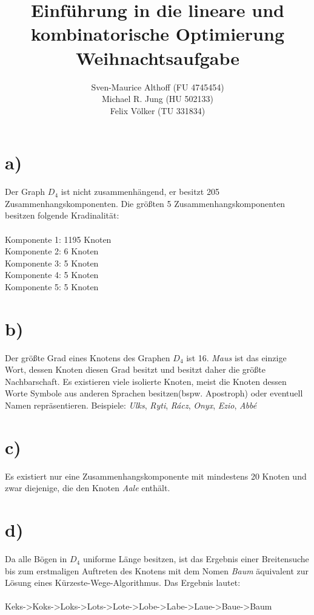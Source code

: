 \documentclass[a4paper,12pt,german]{scrartcl}
\title{Einführung in die lineare und kombinatorische Optimierung\\
Weihnachtsaufgabe}
\author{Sven-Maurice Althoff (FU 4745454)\\Michael R. Jung (HU 502133)\\Felix Völker (TU 331834)}
\begin{document}
\maketitle

\section*{a)}
Der Graph $D_4$ ist nicht zusammenhängend, er besitzt 205 Zusammenhangskomponenten.  Die größten 5 Zusammenhangskomponenten besitzen folgende Kradinalität:\\
\\
Komponente 1: 1195 Knoten\\
Komponente 2: 6 Knoten\\
Komponente 3: 5 Knoten\\
Komponente 4: 5 Knoten\\
Komponente 5: 5 Knoten
\section*{b)}
Der größte Grad eines Knotens des Graphen $D_4$ ist 16. \textit{Maus} ist das einzige Wort, dessen Knoten diesen Grad besitzt und besitzt daher die größte Nachbarschaft. Es existieren viele isolierte Knoten, meist die Knoten dessen Worte Symbole aus anderen Sprachen besitzen(bspw. Apostroph) oder eventuell Namen repräsentieren. Beispiele: \textit{Ulks}, \textit{Ryti}, \textit{Rácz}, \textit{Onyx}, \textit{Ezio}, \textit{Abbé}
\section*{c)}
Es existiert nur eine Zusammenhangskomponente mit mindestens 20 Knoten und zwar diejenige, die den Knoten \textit{Aale} enthält. 
\section*{d)}
Da alle Bögen in $D_4$ uniforme Länge besitzen, ist das Ergebnis einer Breitensuche bis zum erstmaligen Auftreten des Knotens mit dem Nomen \textit{Baum} äquivalent zur Lösung eines Kürzeste-Wege-Algorithmus. Das Ergebnis lautet:\\
\\
Keks->Koks->Loks->Lots->Lote->Lobe->Labe->Laue->Baue->Baum
\end{document}
